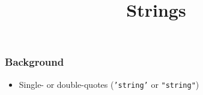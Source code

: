 \documentclass{beamer}
\title[Intro to Python]{Strings}
\begin{document}
\frame{\titlepage}




\begin{frame}
  \frametitle{Background}
  \begin{itemize}
    \item Single- or double-quotes (\texttt{'string'} or \texttt{"string"})
  \end{itemize}
\end{frame}
\end{document}
